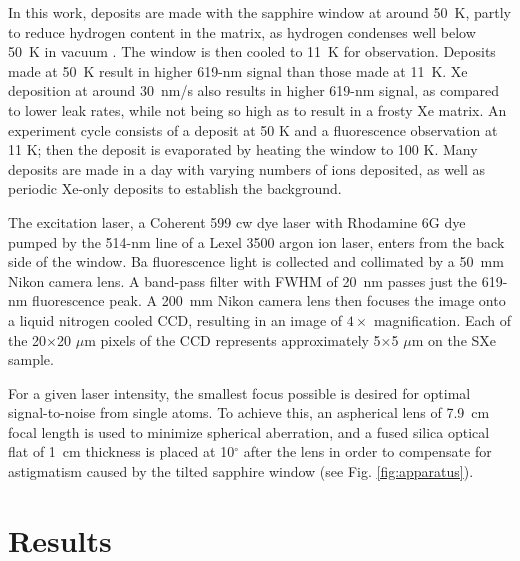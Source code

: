 \documentclass[aps,pra,reprint,superscriptaddress]{revtex4-1}
\begin{document}
In this work, deposits are made with the sapphire window at around 50~K, partly to reduce hydrogen content in the matrix, as hydrogen condenses well below 50~K in vacuum \cite{Mong2015}.  The window is then cooled to 11~K for observation.  Deposits made at 50~K result in higher 619-nm signal than those made at 11~K.  Xe deposition at around 30~nm/s also results in higher 619-nm signal, as compared to lower leak rates, while not being so high as to result in a frosty Xe matrix.  An experiment cycle consists of a deposit at 50 K and a fluorescence observation at 11 K;  then the deposit is evaporated by heating the window to 100 K.  Many deposits are made in a day with varying numbers of ions deposited, as well as periodic Xe-only deposits to establish the background.

The excitation laser, a Coherent 599 cw dye laser with Rhodamine 6G dye pumped by the 514-nm line of a Lexel 3500 argon ion laser, enters from the back side of the window.  Ba fluorescence light is collected and collimated by a 50~mm Nikon camera lens.  A band-pass filter with FWHM of 20~nm passes just the 619-nm fluorescence peak.  A 200~mm Nikon camera lens then focuses the image onto a liquid nitrogen cooled CCD, resulting in an image of $4 \times$ magnification.  Each of the 20$\times$20 $\mu$m pixels of the CCD represents approximately 5$\times$5 $\mu$m on the SXe sample.

For a given laser intensity, the smallest focus possible is desired for optimal signal-to-noise from single atoms.  To achieve this, an aspherical lens of 7.9~cm focal length \cite{asphere} is used to minimize spherical aberration, and a fused silica optical flat of 1~cm thickness is placed at 10$^{\circ}$ after the lens in order to compensate for astigmatism caused by the tilted sapphire window (see Fig. \ref{fig:apparatus}).

\section{Results}
\label{sec:results}


\end{document}

